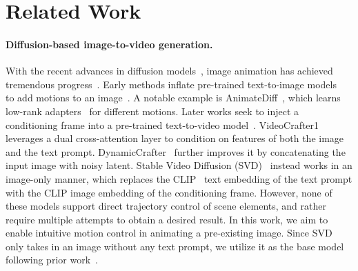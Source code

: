 \section{Related Work}
\label{sec:related}

\paragraph{Diffusion-based image-to-video generation.}
With the recent advances in diffusion models~\citep{DiffusionModels,DDPM}, image animation has achieved tremendous progress~\citep{wang2023videocomposer,VideoCrafter1,VideoCrafter2,AnimateDiff}.
Early methods inflate pre-trained text-to-image models~\citep{LatentDiffusion} to add motions to an image~\citep{Tune-a-video,Text2VideoZero,Make-A-Video}.
A notable example is AnimateDiff~\citep{AnimateDiff}, which learns low-rank adapters~\citep{LoRA}  for different motions.
Later works seek to inject a conditioning frame into a pre-trained text-to-video model~\citep{VideoDiffusionModels,ImagenVideo,LVDM}.
VideoCrafter1~\citep{VideoCrafter1} leverages a dual cross-attention layer to condition on features of both the image and the text prompt.
DynamicCrafter~\citep{DynamiCrafter} further improves it by concatenating the input image with noisy latent.
Stable Video Diffusion (SVD)~\citep{blattmann2023stable} instead works in an image-only manner, which replaces the CLIP~\citep{CLIP} text embedding of the text prompt with the CLIP image embedding of the conditioning frame.
However, none of these models support direct trajectory control of scene elements, and rather require multiple attempts to obtain a desired result.
In this work, we aim to enable intuitive motion control in animating a pre-existing image.
Since SVD only takes in an image without any text prompt, we utilize it as the base model following prior work~\citep{yin2023dragnuwa,wu2024draganything}.





